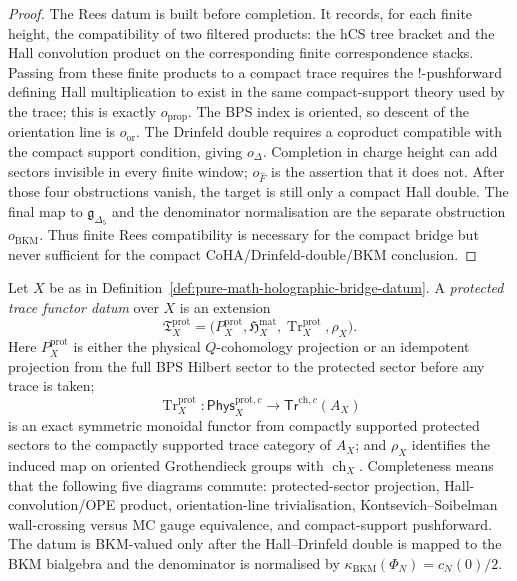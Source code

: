 \begin{proof}
The Rees datum is built before completion. It records, for each
finite height, the compatibility of two filtered products: the hCS tree
bracket and the Hall convolution product on the corresponding finite
correspondence stacks. Passing from these finite products to a compact
trace requires the \( ! \)-pushforward defining Hall multiplication to
exist in the same compact-support theory used by the trace; this is
exactly \(o_{\mathrm{prop}}\). The BPS index is oriented, so descent of
the orientation line is \(o_{\mathrm{or}}\). The Drinfeld double requires
a coproduct compatible with the compact support condition, giving
\(o_{\Delta}\). Completion in charge height can add sectors invisible in
every finite window; \(o_{\widehat{F}}\) is the assertion that it does
not. After those four obstructions vanish, the target is still only a
compact Hall double. The final map to
\(\mathfrak g_{\Delta_5}\) and the denominator normalisation are the
separate obstruction \(o_{\mathrm{BKM}}\). Thus finite Rees
compatibility is necessary for the compact bridge but never sufficient
for the compact CoHA/Drinfeld-double/BKM conclusion.
\end{proof}

\begin{definition}
\label{def:protected-trace-functor-datum}
Let \(X\) be as in
Definition~\ref{def:pure-math-holographic-bridge-datum}. A
\emph{protected trace functor datum} over \(X\) is an extension
\[
 \mathfrak T_X^{\mathrm{prot}}
 =
 \bigl(P_X^{\mathrm{prot}},\mathfrak H_X^{\mathrm{mat}},
 \operatorname{Tr}^{\mathrm{prot}}_X,\rho_X\bigr).
\]
Here \(P_X^{\mathrm{prot}}\) is either the physical \(Q\)-cohomology
projection or an idempotent projection from the full BPS Hilbert sector
to the protected sector before any trace is taken;
\[
 \operatorname{Tr}^{\mathrm{prot}}_X\colon
 \mathsf{Phys}^{\mathrm{prot},c}_X
 \longrightarrow
 \mathsf{Tr}^{\mathrm{ch},c}(A_X)
\]
is an exact symmetric monoidal functor from compactly supported
protected sectors to the compactly supported trace category of
\(A_X\); and \(\rho_X\) identifies the induced map on oriented
Grothendieck groups with \(\operatorname{ch}_X\). Completeness means
that the following five diagrams commute: protected-sector projection,
Hall-convolution/OPE product, orientation-line trivialisation,
Kontsevich--Soibelman wall-crossing versus MC gauge equivalence, and
compact-support pushforward. The datum is BKM-valued only after the
Hall--Drinfeld double is mapped to the BKM bialgebra and the denominator
is normalised by
\(\kappa_{\mathrm{BKM}}(\Phi_N)=c_N(0)/2\).
\end{definition}

